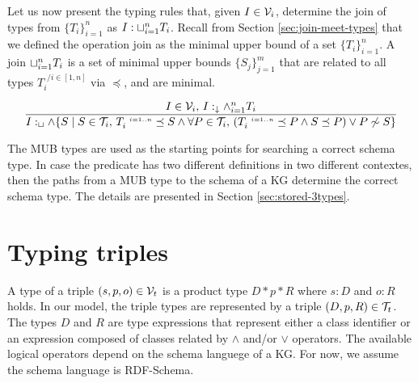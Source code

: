 \documentclass[runningheads]{llncs}
\newcommand{\s}{\scriptscriptstyle\ \,}
\newcommand{\darr}{\downarrow}
\newcommand{\Darr}{\Downarrow}
\newcommand{\V}{{\cal V}}
\newcommand{\T}{{\cal T}}
\newcommand{\memo}[1]{}
\begin{document}
\memo{
\begin{equation}
\label{rul:min-gather}
\dfrac{I\in\V_i\quad\forall\/i=1..m,\ I:_\Darr\/S_i}
      {V:_{\Darr}\land_{j=1}^m\/S_j}
    \end{equation}}
  

Let us now present the typing rules that, given $I\in\V_i$, determine
the join of types from $\{T_i\}_{i=1}^n$ as
$I:\sqcup_{i=1}^n\/T_i$. Recall from Section \ref{sec:join-meet-types}
that we defined the operation join as the minimal upper bound of a set
$\{T_i\}_{i=1}^n$. A join $\sqcup_{i=1}^n\/T_i$ is a set of
minimal upper bounds $\{S_j\}_{j=1}^m$ that are related to all
types $T_i^{\s/i\in[1,n]}$ via $\preceq$, and are minimal.

\begin{equation}
\label{rul:join-logic}
\dfrac{I\in\V_i,\, \/I:_\darr\land_{i=1}^n\/T_i}
      {I:_\sqcup\land\{S \mid \/S\in\T_i,\,\/T_i^{\s\/i=1..n}\preceq\/S\land\forall\/P\in\T_i,\,(T_i^{\s\/i=1..n}\preceq\/P\land\/S\preceq\/P)\lor\/P\not\sim\/S\}}
\end{equation}

\memo{
The individual MUB types derived by the above rule are gathered
into one $\land$ type of MUB types by using the following rule.

\begin{equation}
\label{rul:join-gather}
\dfrac{I\in\V_i\quad\/S_i^{\s\/i=1..m}\in\T_i\quad\forall\/i=1..m,\, I:_\sqcup\/S_i}
{I:_{\sqcup}\land_{i=1}^m\/S_i}
\end{equation}}

The MUB types are used as the starting points for searching a correct
schema type. In case the predicate has two different definitions in
two different contextes, then the paths from a MUB type to the schema
of a KG determine the correct schema type. The details are presented
in Section \ref{sec:stored-3types}.






\section{Typing triples\label{sec:triples}}



A type of a triple $(s,p,o)\in\V_t$ is a product type $D*p*R$
where $s:D$ and $o:R$ holds. In our model, the triple types are
represented by a triple $(D,p,R)\in\T_t$. The types $D$ and $R$ are
type expressions that represent either a class identifier or an 
expression composed of classes related by $\land$ and/or $\lor$
operators. The available logical operators depend on the schema
languege of a KG. For now, we assume the schema language is
RDF-Schema.
\end{document}
